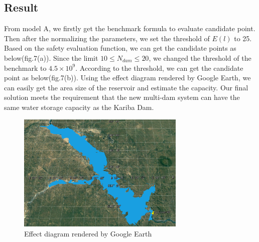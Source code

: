 \documentclass{mcmthesis}
\begin{document}
\subsection{Result}
\indent \indent From model A, we firstly get the benchmark formula to evaluate candidate point. Then after the normalizing the parameters, we set the threshold of $E(l)$ to 25. Based on the safety evaluation function, we can get the candidate points as below(fig.7(a)). Since the limit $10 \le N_{dam} \le 20 $, we changed the threshold of the benchmark to $4.5\times10^{9}$. According to the threshold, we can get the candidate point as below(fig.7(b)). Using the effect diagram rendered by Google Earth, we can easily get the area size of the reservoir and estimate the capacity. Our final solution meets the requirement that the new multi-dam system can have the same water storage capacity as the Kariba Dam.\\
\begin{figure}[h]
\small
\centering
\includegraphics[width=8cm]{./figures/reservoir.png}
\caption{Effect diagram rendered by Google Earth} \label{fig:Fig1}
\end{figure}
\end{document}
